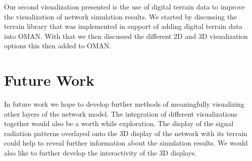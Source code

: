 Our second visualization presented is the use of digital terrain data to improve the visualization of network simulation results.  We started by discussing the terrain library that was implemented in support of adding digital terrain data into OMAN.  With that we then discussed the different 2D and 3D visualization options this then added to OMAN.

\section{Future Work}
In future work we hope to develop further methods of meaningfully visualizing other layers of the network model.  The integration of different visualizations together would also be a worth while exploration.  The display of the signal radiation patterns overlayed onto the 3D display of the network with its terrain could help to reveal further information about the simulation results.  We would also like to further develop the interactivity of the 3D displays.

